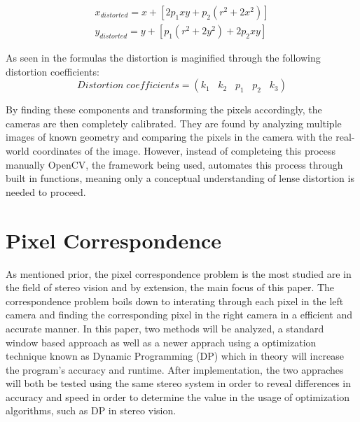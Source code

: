\documentclass[11pt]{scrartcl}
\begin{document}
\begin{theorem}
    \begin{align}
        x_{distorted} = x + [ 2p_1xy + p_2(r^2+2x^2)]  
       \\ y_{distorted} = y + [ p_1(r^2+ 2y^2)+ 2p_2xy]
    \end{align}
    
\end{theorem}

As seen in the formulas the distortion is maginified through the following distortion coefficients: 
\begin{displaymath}
    Distortion \; coefficients=(k_1 \hspace{10pt} k_2 \hspace{10pt} p_1 \hspace{10pt} p_2 \hspace{10pt} k_3)
\end{displaymath}

By finding these components and transforming the pixels accordingly, the cameras are then 
completely calibrated. They are found by analyzing multiple images of known geometry and 
comparing the pixels in the camera with the real-world coordinates of the image. However, 
instead of completeing this process manually OpenCV, the framework being used, automates this 
process through built in functions, meaning only a conceptual understanding of lense distortion 
is needed to proceed. 

\section{Pixel Correspondence}

As mentioned prior, the pixel correspondence problem is the most studied are in the 
field of stereo vision and by extension, the main focus of this paper. The correspondence 
problem boils down to interating through each pixel in the left camera and finding the 
corresponding pixel in the right camera in a efficient and accurate manner. In this paper, 
two methods will be analyzed, a standard window based approach as well as a newer apprach 
using a optimization technique known as Dynamic Programming (DP) which in theory will increase 
the program's accuracy and runtime. After implementation, the 
two appraches will both be tested using the same stereo system in order to reveal differences 
in accuracy and speed in order to determine the value in the usage of optimization algorithms, 
such as DP in stereo vision. 
\end{document}

